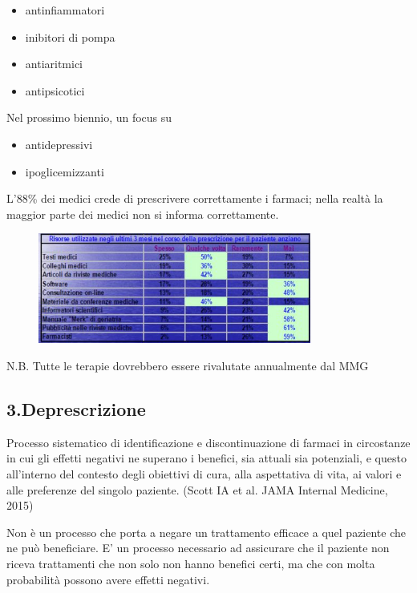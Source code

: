\begin{itemize}
\item antinfiammatori
\item inibitori di pompa
\item antiaritmici
\item antipsicotici
\end{itemize}

  Nel prossimo biennio, un focus su
  
\begin{itemize}
\item antidepressivi
\item ipoglicemizzanti
\end{itemize}

  L'88\% dei medici crede di prescrivere correttamente i farmaci; nella
  realtà la maggior parte dei medici non si informa correttamente.

  \begin{figure}[!ht]
\centering
	\includegraphics[width=0.8\textwidth]{37/image4.jpg}
	\end{figure}

  N.B. Tutte le terapie dovrebbero essere rivalutate annualmente dal MMG

  \subsection{3.Deprescrizione}
  
  Processo sistematico di identificazione e discontinuazione di farmaci
  in circostanze in cui gli effetti negativi ne superano i benefici, sia
  attuali sia potenziali, e questo all'interno del contesto degli
  obiettivi di cura, alla aspettativa di vita, ai valori e alle
  preferenze del singolo paziente. (Scott IA et al. JAMA Internal
  Medicine, 2015)

  Non è un processo che porta a negare un trattamento efficace a quel
  paziente che ne può beneficiare. E' un processo necessario ad
  assicurare che il paziente non riceva trattamenti che non solo non
  hanno benefici certi, ma che con molta probabilità possono avere
  effetti negativi.

